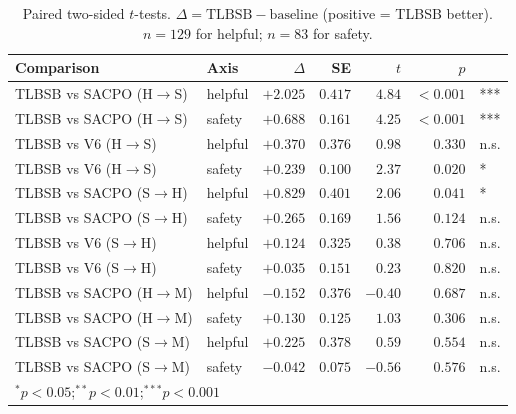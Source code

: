 \begin{table}[h]
\centering
\caption{Paired two-sided $t$-tests. $\Delta = \text{TLBSB} - \text{baseline}$
(positive = TLBSB better). $n=129$ for helpful; $n=83$ for safety.}
\label{tab:ttest}
\small
\begin{tabular}{llrrrrl}
\toprule
Comparison & Axis & $\Delta$ & SE & $t$ & $p$ & \\
\midrule
TLBSB vs SACPO (H$\to$S) & helpful & $+2.025$ & $0.417$ & $4.84$ & $<0.001$ & *** \\
TLBSB vs SACPO (H$\to$S) & safety  & $+0.688$ & $0.161$ & $4.25$ & $<0.001$ & *** \\
TLBSB vs V6   (H$\to$S) & helpful & $+0.370$ & $0.376$ & $0.98$ & $0.330$  & n.s.\\
TLBSB vs V6   (H$\to$S) & safety  & $+0.239$ & $0.100$ & $2.37$ & $0.020$  & *   \\
\midrule
TLBSB vs SACPO (S$\to$H) & helpful & $+0.829$ & $0.401$ & $2.06$ & $0.041$ & *   \\
TLBSB vs SACPO (S$\to$H) & safety  & $+0.265$ & $0.169$ & $1.56$ & $0.124$ & n.s.\\
TLBSB vs V6   (S$\to$H) & helpful & $+0.124$ & $0.325$ & $0.38$ & $0.706$ & n.s.\\
TLBSB vs V6   (S$\to$H) & safety  & $+0.035$ & $0.151$ & $0.23$ & $0.820$ & n.s.\\
\midrule
TLBSB vs SACPO (H$\to$M) & helpful & $-0.152$ & $0.376$ & $-0.40$ & $0.687$ & n.s.\\
TLBSB vs SACPO (H$\to$M) & safety  & $+0.130$ & $0.125$ & $1.03$ & $0.306$ & n.s.\\
TLBSB vs SACPO (S$\to$M) & helpful & $+0.225$ & $0.378$ & $0.59$ & $0.554$ & n.s.\\
TLBSB vs SACPO (S$\to$M) & safety  & $-0.042$ & $0.075$ & $-0.56$ & $0.576$ & n.s.\\
\bottomrule
\multicolumn{7}{l}{$^{*}p<0.05$;\quad $^{**}p<0.01$;\quad $^{***}p<0.001$}
\end{tabular}
\end{table}

